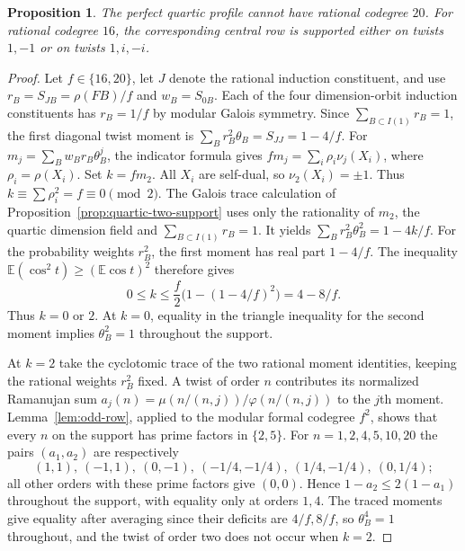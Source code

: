 \documentclass[11pt,a4paper]{article}
\newtheorem{proposition}[theorem]{Proposition}
\numberwithin{equation}{section}
\begin{document}
\begin{proposition}\label{prop:quartic-twenty}
The perfect quartic profile cannot have rational codegree $20$.
For rational codegree $16$, the corresponding central row is supported
either on twists $1,-1$ or on twists $1,i,-i$.
\end{proposition}
\begin{proof}
Let $f\in\{16,20\}$, let $J$ denote the rational induction
constituent, and use $r_B=S_{JB}=\rho(FB)/f$ and $w_B=S_{0B}$.
Each of the four dimension-orbit induction constituents has $r_B=1/f$
by modular Galois symmetry. Since $\sum_{B\subset I(1)}r_B=1$,
the first diagonal twist moment is
$\sum_B r_B^2\theta_B=S_{JJ}=1-4/f$.
For $m_j=\sum_B w_B r_B\theta_B^j$, the indicator formula gives
$f m_j=\sum_i\rho_i\nu_j(X_i)$, where $\rho_i=\rho(X_i)$.
Set $k=fm_2$. All $X_i$ are self-dual, so $\nu_2(X_i)=\pm1$.
Thus $k\equiv\sum\rho_i^2=f\equiv0\pmod2$.
The Galois trace calculation of Proposition~\ref{prop:quartic-two-support}
uses only the rationality of $m_2$, the quartic dimension field and
$\sum_{B\subset I(1)}r_B=1$.
It yields $\sum_B r_B^2\theta_B^2=1-4k/f$.
For the probability weights $r_B^2$, the first moment has real part
$1-4/f$. The inequality $\mathbb E(\cos^2 t)\ge(\mathbb E\cos t)^2$
therefore gives
\[
 0\le k\le \frac f2\bigl(1-(1-4/f)^2\bigr)=4-8/f.
\]
Thus $k=0$ or $2$. At $k=0$, equality in the triangle inequality for
the second moment implies $\theta_B^2=1$ throughout the support.

At $k=2$ take the cyclotomic trace of the two rational moment
identities, keeping the rational weights $r_B^2$ fixed.
A twist of order $n$ contributes its normalized Ramanujan sum
$a_j(n)=\mu(n/(n,j))/\varphi(n/(n,j))$ to the $j$th moment.
Lemma~\ref{lem:odd-row}, applied to the modular formal codegree
$f^2$, shows that every $n$ on the support has prime factors in
$\{2,5\}$.
For $n=1,2,4,5,10,20$ the pairs $(a_1,a_2)$ are respectively
\[
 (1,1),\ (-1,1),\ (0,-1),\ (-1/4,-1/4),\
 (1/4,-1/4),\ (0,1/4);
\]
all other orders with these prime factors give $(0,0)$.
Hence $1-a_2\le2(1-a_1)$ throughout the support, with equality
only at orders $1,4$. The traced moments give equality after averaging
since their deficits are $4/f,8/f$, so $\theta_B^4=1$ throughout,
and the twist of order two does not occur when $k=2$.


\end{proof}
\end{document}
